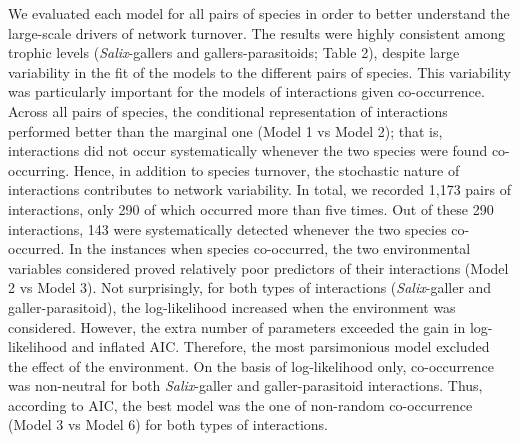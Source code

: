 \documentclass[12pt]{article}
\begin{document}
We evaluated each model for all pairs of species in order to better understand
the large-scale drivers of network turnover. The results were highly
consistent among trophic levels (\textit{Salix}-gallers and
gallers-parasitoids; Table 2), despite large variability in the fit
of the models to the different pairs of species. This variability was
particularly important for the models of interactions given co-occurrence.
Across all pairs of species, the conditional representation of interactions
performed better than the marginal one (Model 1 vs Model 2); that is,
interactions did not occur systematically whenever the two species were found
co-occurring. Hence, in addition to species turnover, the stochastic nature of
interactions contributes to network variability. In total, we recorded 1,173
pairs of interactions, only 290 of which occurred more than five times. Out of
these 290 interactions, 143 were systematically detected whenever the two
species co-occurred. In the instances when species co-occurred, the two
environmental variables considered proved relatively poor predictors of their
interactions (Model 2 vs Model 3). Not surprisingly, for both types of
interactions (\textit{Salix}-galler and galler-parasitoid), the log-likelihood
increased when the environment was considered. However, the extra number of
parameters exceeded the gain in log-likelihood and inflated AIC. Therefore,
the most parsimonious model excluded the effect of the environment. On the
basis of log-likelihood only, co-occurrence was non-neutral for both
\textit{Salix}-galler and galler-parasitoid interactions. Thus, according to
AIC, the best model was the one of non-random co-occurrence (Model 3 vs Model
6) for both types of interactions.

\end{document}
